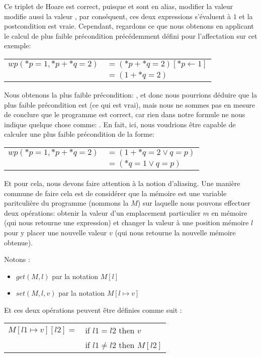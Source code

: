 Ce triplet de Hoare est correct, puisque  et  sont en
alias, modifier la valeur  modifie aussi la valeur ,
par conséquent, ces deux expressions s'évaluent à $1$ et la postcondition est 
vraie. Cependant, regardons ce que nous obtenons en applicant le calcul de plus
faible précondition précédemment défini pour l'affectation sur cet exemple:


\begin{tabular}{ll}
$wp(*p = 1, *p + *q = 2)$ & $= (*p + *q = 2)[*p \leftarrow 1]$\\
                          & $= (1 + *q = 2)$
\end{tabular}


Nous obtenons la plus faible précondition: , et donc 
nous pourrions déduire que la plus faible précondition est 
(ce qui est vrai), mais nous ne sommes pas en mesure de conclure que le programme
est correct, car rien dans notre formule ne nous indique quelque chose comme:
. En fait, ici, nous voudrions être capable de 
calculer une plus faible précondition de la forme:


\begin{tabular}{ll}
$wp(*p = 1, *p + *q = 2)$ & $= (1 + *q = 2 \vee q = p)$\\
                          & $= (*q = 1 \vee q = p)$
\end{tabular}


Et pour cela, nous devons faire attention à la notion d'aliasing. Une manière
commune de faire cela est de considérer que la mémoire est une variable paritculière
du programme (nommons la $M$) sur laquelle nous pouvons effectuer deux opérations:
obtenir la valeur d'un emplacement particulier $m$ en mémoire (qui nous retourne une
expression) et changer la valeur à une position mémoire $l$ pour y placer une nouvelle
valeur $v$ (qui nous retourne la nouvelle mémoire obtenue).


Notons :


\begin{itemize}
\item $get(M,l)$ par la notation $M[l]$
\item $set(M,l,v)$ par la notation $M[l \mapsto v]$
\end{itemize}


Et ces deux opérations peuvent être définies comme suit :


\begin{tabular}{ll}
  $M[l1 \mapsto v][l2] =$ & if $l1   =  l2$ then $v$ \\
                          & if $l1 \neq l2$ then $M[l2]$
\end{tabular}


